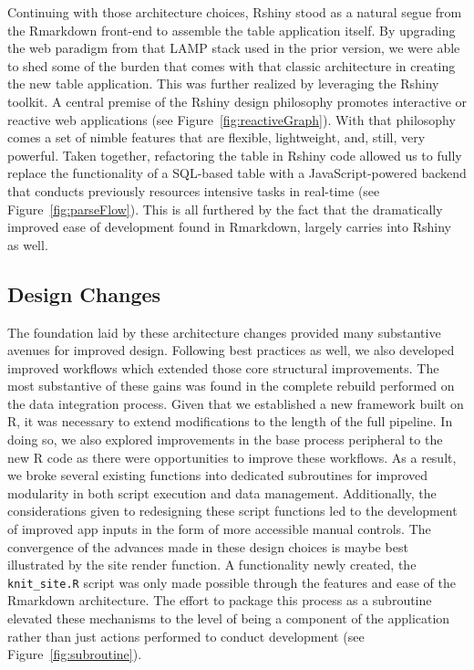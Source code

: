 \documentclass[10pt]{report}
\begin{document}
Continuing with those architecture choices, Rshiny stood as a natural segue from the Rmarkdown front-end to assemble the table application itself. By upgrading the web paradigm from that LAMP stack used in the prior version, we were able to shed some of the burden that comes with that classic architecture in creating the new table application. This was further realized by leveraging the Rshiny toolkit. A central premise of the Rshiny design philosophy promotes interactive or reactive web applications (see Figure~\ref{fig:reactiveGraph}). With that philosophy comes a set of nimble features that are flexible, lightweight, and, still, very powerful. Taken together, refactoring the table in Rshiny code allowed us to fully replace the functionality of a SQL-based table with a JavaScript-powered backend that conducts previously resources intensive tasks in real-time (see Figure~\ref{fig:parseFlow}). This is all furthered by the fact that the dramatically improved ease of development found in Rmarkdown, largely carries into Rshiny as well.

\subsection{Design Changes}
The foundation laid by these architecture changes provided many substantive avenues for improved design. Following best practices as well, we also developed improved workflows which extended those core structural improvements. The most substantive of these gains was found in the complete rebuild performed on the data integration process. Given that we established a new framework built on R, it was necessary to extend modifications to the length of the full pipeline. In doing so, we also explored improvements in the base process peripheral to the new R code as there were opportunities to improve these workflows. As a result, we broke several existing functions into dedicated subroutines for improved modularity in both script execution and data management. Additionally, the considerations given to redesigning these script functions led to the development of improved app inputs in the form of more accessible manual controls. The convergence of the advances made in these design choices is maybe best illustrated by the site render function. A functionality newly created, the \texttt{knit\_site.R} script was only made possible through the features and ease of the Rmarkdown architecture. The effort to package this process as a subroutine elevated these mechanisms to the level of being a component of the application rather than just actions performed to conduct development (see Figure~\ref{fig:subroutine}).
\end{document}
